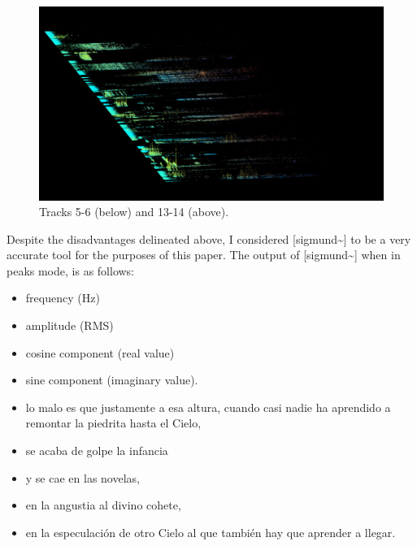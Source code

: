 \documentclass{article}
\begin{document}
\begin{figure}
\begin{multicols}{2}
    \includegraphics[width=\linewidth]{preset-50-6.jpg}%
\end{multicols}

\caption{Tracks 5-6 (below) and 13-14 (above).}
\end{figure}



Despite the disadvantages delineated above, I considered [sigmund\~{}] to be a very accurate tool for the purposes of this paper. The output of [sigmund\~{}] when in peaks mode, is as follows:

\begin{itemize}
\item frequency (Hz)
\item amplitude (RMS)
\item cosine component (real value)
\item sine component (imaginary value).
\item lo malo es que justamente a esa altura, cuando casi nadie ha aprendido a remontar la piedrita hasta el Cielo,
\item se acaba de golpe la infancia 
\item y se cae en las novelas, 
\item en la angustia al divino cohete, 
\item en la especulaci\'{o}n de otro Cielo al que tambi\'{e}n hay que aprender a llegar. 
\end{itemize}
\end{document}
